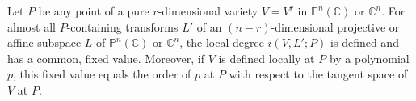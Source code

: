Let $P$ be any point of a pure $r$-dimensional variety $V = V^r$ in $\mathbb{P}^n(\mathbb{C})$ or $\mathbb{C}^n$. For almost all $P$-containing transforms $L'$ of an $(n-r)$-dimensional projective or affine subspace $L$ of $\mathbb{P}^n(\mathbb{C})$ or $\mathbb{C}^n$, the local degree $i(V, L'; P)$ is defined and has a common, fixed value. Moreover, if $V$ is defined locally at $P$ by a polynomial $p$, this fixed value equals the order of $p$ at $P$ with respect to the tangent space of $V$ at $P$.
